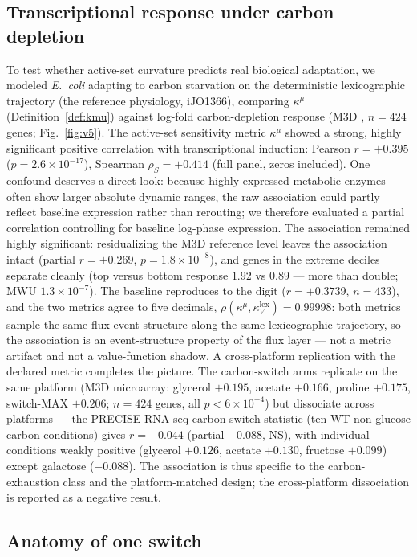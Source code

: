 \documentclass[11pt,a4paper]{article}
\theoremstyle{plain}
\theoremstyle{definition}
\theoremstyle{remark}
\newcommand{\kk}{\kappa_{\!V}}
\newcommand{\kmu}{\kappa^{\mu}}
\begin{document}
\subsection{Transcriptional response under carbon depletion}
\label{sec:v5}
To test whether active-set curvature predicts real biological
adaptation, we modeled \emph{E.~coli} adapting to carbon starvation on
the deterministic lexicographic trajectory (the reference physiology,
iJO1366), comparing $\kmu$ (Definition~\ref{def:kmu}) against
log-fold carbon-depletion response (M3D \citep{faith2008}, $n = 424$
genes; Fig.~\ref{fig:v5}). The active-set sensitivity metric $\kmu$
showed a strong, highly significant positive correlation with
transcriptional induction: Pearson
$r = +0.395$ ($p = 2.6 \times 10^{-17}$), Spearman
$\rho_S = +0.414$ (full panel, zeros included). One confound
deserves a direct look: because highly expressed metabolic enzymes
often show larger absolute dynamic ranges, the raw association could
partly reflect baseline expression rather than rerouting; we
therefore evaluated a partial correlation controlling for baseline
log-phase expression. The association remained highly significant:
residualizing the M3D reference level leaves the association intact
(partial $r = +0.269$, $p = 1.8 \times 10^{-8}$), and genes in the
extreme deciles separate cleanly (top versus bottom response $1.92$
vs $0.89$ --- more than double; MWU $1.3 \times 10^{-7}$). The baseline reproduces to the
digit ($r = +0.3739$, $n = 433$), and the two metrics agree to
five decimals, $\rho(\kmu, \kk^{\mathrm{lex}}) = 0.99998$: both
metrics sample the
same flux-event structure along the same lexicographic trajectory,
so the association is an event-structure property of the flux layer ---
not a metric artifact and not a value-function shadow. A
cross-platform replication with the declared metric completes the
picture. The carbon-switch arms replicate on the same platform (M3D
microarray: glycerol $+0.195$, acetate $+0.166$, proline $+0.175$,
switch-MAX $+0.206$; $n = 424$ genes, all $p < 6 \times 10^{-4}$)
but dissociate across platforms --- the PRECISE RNA-seq
carbon-switch statistic (ten WT non-glucose carbon conditions)
gives $r = -0.044$ (partial $-0.088$, NS), with individual
conditions weakly positive (glycerol $+0.126$, acetate $+0.130$,
fructose $+0.099$) except galactose ($-0.088$). The association is
thus specific to the carbon-exhaustion class and the platform-matched
design; the cross-platform dissociation is reported as a negative
result.

\subsection{Anatomy of one switch}\label{sec:anatomy}
\end{document}
